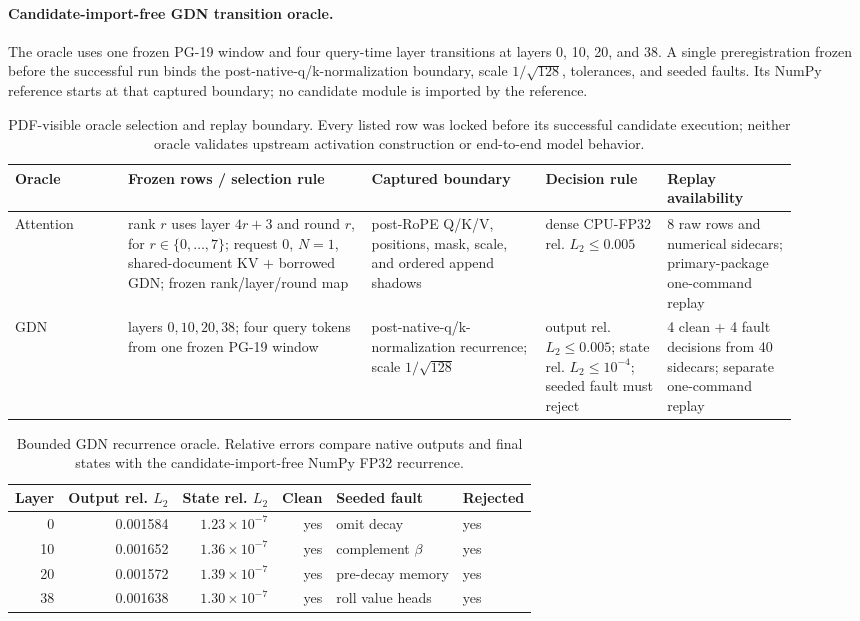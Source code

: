 \documentclass{article}
\begin{document}
\paragraph{Candidate-import-free GDN transition oracle.}
The oracle uses one frozen PG-19 window and four query-time layer transitions
at layers 0, 10, 20, and 38.  A single preregistration frozen before the
successful run binds the post-native-q/k-normalization boundary, scale
$1/\sqrt{128}$, tolerances, and seeded faults.  Its NumPy reference starts at
that captured boundary; no candidate module is imported by the reference.

\begin{table}[H]
\caption{PDF-visible oracle selection and replay boundary.  Every listed row
was locked before its successful candidate execution; neither oracle validates
upstream activation construction or end-to-end model behavior.}
\label{tab:oracle-selection}
\centering\scriptsize
\setlength{\tabcolsep}{3pt}
\begin{tabular}{@{}p{0.13\linewidth}p{0.29\linewidth}p{0.20\linewidth}p{0.14\linewidth}p{0.15\linewidth}@{}}
\toprule
Oracle & Frozen rows / selection rule & Captured boundary & Decision rule & Replay availability \\
\midrule
Attention & rank $r$ uses layer $4r+3$ and round $r$, for
$r\in\{0,\ldots,7\}$; request 0, $N=1$, shared-document KV + borrowed GDN;
frozen rank/layer/round map
& post-RoPE Q/K/V, positions, mask, scale, and ordered append shadows
& dense CPU-FP32 rel. $L_2\leq0.005$
& 8 raw rows and numerical sidecars; primary-package one-command replay \\
GDN & layers $0,10,20,38$; four query tokens from one frozen PG-19 window
& post-native-q/k-normalization recurrence; scale $1/\sqrt{128}$
& output rel. $L_2\leq0.005$; state rel. $L_2\leq10^{-4}$; seeded fault must reject
& 4 clean + 4 fault decisions from 40 sidecars; separate one-command replay \\
\bottomrule
\end{tabular}
\end{table}

\begin{table}[H]
\caption{Bounded GDN recurrence oracle.  Relative errors compare native outputs
and final states with the candidate-import-free NumPy FP32 recurrence.}
\label{tab:gdn-oracle}
\centering\small
\begin{tabular}{@{}rrrrll@{}}
\toprule
Layer & Output rel. $L_2$ & State rel. $L_2$ & Clean & Seeded fault & Rejected \\
\midrule
0  & 0.001584 & $1.23\times10^{-7}$ & yes & omit decay & yes \\
10 & 0.001652 & $1.36\times10^{-7}$ & yes & complement $\beta$ & yes \\
20 & 0.001572 & $1.39\times10^{-7}$ & yes & pre-decay memory & yes \\
38 & 0.001638 & $1.30\times10^{-7}$ & yes & roll value heads & yes \\
\bottomrule
\end{tabular}
\end{table}
\end{document}
